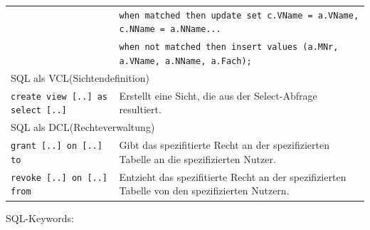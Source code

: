 \documentclass{article}
\begin{document}
\begin{center}
\begin{longtable}{|p{4cm}|p{7cm}|}
    & \texttt{when matched then update set c.VName = a.VName, c.NName = a.NName...} \\
    & \texttt{when not matched then insert values (a.MNr, a.VName, a.NName, a.Fach);} \\
    \hline
    \multicolumn{2}{|p{11cm}|}{SQL als VCL(Sichtendefinition)} \\
    \hline
    \texttt{create view [..] as select [..]} & Erstellt eine Sicht, die aus der Select-Abfrage resultiert. \\
    \hline
    \multicolumn{2}{|p{11cm}|}{SQL als DCL(Rechteverwaltung)} \\
    \hline
    \texttt{grant [..] on [..] to} &  Gibt das spezifitierte Recht an der spezifizierten Tabelle an die spezifizierten Nutzer.\\
    \hline
    \texttt{revoke [..] on [..] from} & Entzieht das spezifitierte Recht an der spezifizierten Tabelle von den spezifizierten Nutzern. \\
    \hline
  \end{longtable}
\end{center}
SQL-Keywords:
\end{document}
